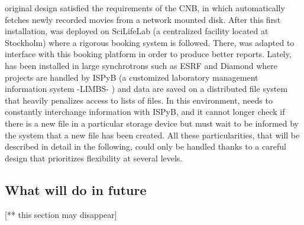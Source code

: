 \scipion original design satisfied the requirements of the CNB, in which \scipion automatically fetches newly recorded movies from a network mounted disk. After this first installation, \scipion was deployed on SciLifeLab (a centralized facility located at Stockholm) where a rigorous booking system is followed. There, \scipion was adapted to interface with this booking platform in order to produce better reports. Lately,  \scipion has been installed in  large synchrotrons  such as ESRF and Diamond  where projects are handled by ISPyB (a customized laboratory management information system -LIMBS- \citep{Delageniere2011}) and data are saved on a distributed file system that heavily penalizes access to lists of files. In this environment, \scipion needs to constantly interchange information with ISPyB, and it cannot longer check if there is a new file in a particular storage device but must wait to be informed by the system that a new file has been created. All these particularities, that will be described in detail in the following, could only be handled thanks to a careful design that prioritizes flexibility at several levels. 







\subsection{What will do in future}
[** this section may disappear] 



